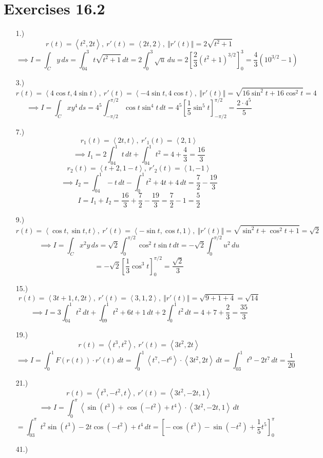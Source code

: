 \documentclass[12pt]{article}
\newcommand{\angleb}[1]{\left\langle#1\right\rangle}
\newcommand{\bracks}[1]{\left[#1\right]}
\begin{document}
\section*{Exercises 16.2}
\begin{itemize}
    \item[1.)] \[r(t)=\angleb{t^2,2t},\ r'(t)=\angleb{2t,2},\ \Vert r'(t)\Vert=2\sqrt{t^2+1}\]
    \[\implies I=\int_Cy\,ds=\int^3_04t\sqrt{t^2+1}\,dt=2\int^3_0\sqrt u\,du=2\bracks{\frac{2}{3}(t^2+1)^{3/2}}^3_0=\frac{4}{3}(10^{3/2}-1)\]

    \item[3.)] \[r(t)=\angleb{4\cos t,4\sin t},\ r'(t)=\angleb{-4\sin t,4\cos t},\ \Vert r'(t)\Vert=\sqrt{16\sin^2t+16\cos^2t}=4\]
    \[\implies I=\int_Cxy^4\,ds=4^5\int^{\pi/2}_{-\pi/2}\cos t\sin^4 t\,dt=4^5\bracks{\frac{1}{5}\sin^5t}^{\pi/2}_{-\pi/2}=\frac{2\cdot4^5}{5}\]

    \item[7.)] \[r_1(t)=\angleb{2t,t},\ r'_1(t)=\angleb{2,1}\]
    \[\implies I_1=2\int^1_04t\,dt+\int^1_04t^2=4+\frac{4}{3}=\frac{16}{3}\]
    \[r_2(t)=\angleb{t+2,1-t},\ r'_2(t)=\angleb{1,-1}\]
    \[\implies I_2=\int^1_04-t\,dt-\int^1_0t^2+4t+4\,dt=\frac{7}{2}-\frac{19}{3}\]
    \[I=I_1+I_2=\frac{16}{3}+\frac{7}{2}-\frac{19}{3}=\frac{7}{2}-1=\frac52\]

    \item[9.)] \[r(t)=\angleb{\cos t,\sin t,t},\ r'(t)=\angleb{-\sin t,\cos t,1},\ \Vert r'(t)\Vert=\sqrt{\sin^2t+\cos^2t+1}=\sqrt2\]
    \[\implies I=\int_Cx^2y\,ds=\sqrt2\int^{\pi/2}_0\cos^2t\sin t\,dt=-\sqrt2\int^{\pi/2}_0u^2\,du\]
    \[=-\sqrt2\bracks{\frac{1}{3}\cos^3t}^{\pi/2}_0=\frac{\sqrt2}{3}\]

    \item[15.)] \[r(t)=\angleb{3t+1,t,2t},\ r'(t)=\angleb{3,1,2},\ \Vert r'(t)\Vert=\sqrt{9+1+4}=\sqrt{14}\]
    \[\implies I=3\int^1_04t^2\,dt+\int^1_09t^2+6t+1\,dt+2\int^1_0t^2\,dt=4+7+\frac{2}{3}=\frac{35}{3}\]

    \item[19.)] \[r(t)=\angleb{t^3,t^2},\ r'(t)=\angleb{3t^2,2t}\]
    \[\implies I=\int^1_0F(r(t))\cdot r'(t)\,dt=\int^1_0\angleb{t^7,-t^6}\cdot\angleb{3t^2,2t}\,dt=\int^1_03t^9-2t^7\,dt=\frac{1}{20}\]

    \item[21.)] \[r(t)=\angleb{t^3,-t^2,t},\ r'(t)=\angleb{3t^2,-2t,1}\]
    \[\implies I=\int^\pi_0\angleb{\sin(t^3)+\cos(-t^2)+t^4}\cdot\angleb{3t^2,-2t,1}\,dt\]
    \[=\int^\pi_03t^2\sin(t^3)-2t\cos(-t^2)+t^4\,dt=\bracks{-\cos(t^3)-\sin(-t^2)+\frac{1}{5}t^5}^\pi_0\]

    \item[41.)]
\end{itemize}
\end{document}
